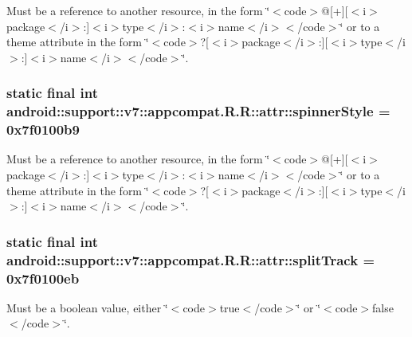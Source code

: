Must be a reference to another resource, in the form \char`\"{}$<$code$>$@\mbox{[}+\mbox{]}\mbox{[}$<$i$>$package$<$/i$>$:\mbox{]}$<$i$>$type$<$/i$>$:$<$i$>$name$<$/i$>$$<$/code$>$\char`\"{} or to a theme attribute in the form \char`\"{}$<$code$>$?\mbox{[}$<$i$>$package$<$/i$>$:\mbox{]}\mbox{[}$<$i$>$type$<$/i$>$:\mbox{]}$<$i$>$name$<$/i$>$$<$/code$>$\char`\"{}. \hypertarget{classandroid_1_1support_1_1v7_1_1appcompat_1_1_r_1_1attr_24d201f044f0d5b840ca6de000935185}{
\subsubsection[{spinnerStyle}]{\setlength{\rightskip}{0pt plus 5cm}static final int android::support::v7::appcompat.R.R::attr::spinnerStyle = 0x7f0100b9}}
\label{classandroid_1_1support_1_1v7_1_1appcompat_1_1_r_1_1attr_24d201f044f0d5b840ca6de000935185}


Must be a reference to another resource, in the form \char`\"{}$<$code$>$@\mbox{[}+\mbox{]}\mbox{[}$<$i$>$package$<$/i$>$:\mbox{]}$<$i$>$type$<$/i$>$:$<$i$>$name$<$/i$>$$<$/code$>$\char`\"{} or to a theme attribute in the form \char`\"{}$<$code$>$?\mbox{[}$<$i$>$package$<$/i$>$:\mbox{]}\mbox{[}$<$i$>$type$<$/i$>$:\mbox{]}$<$i$>$name$<$/i$>$$<$/code$>$\char`\"{}. \hypertarget{classandroid_1_1support_1_1v7_1_1appcompat_1_1_r_1_1attr_70ef0c886c3a0e04aaa65552666d0dc7}{
\subsubsection[{splitTrack}]{\setlength{\rightskip}{0pt plus 5cm}static final int android::support::v7::appcompat.R.R::attr::splitTrack = 0x7f0100eb}}
\label{classandroid_1_1support_1_1v7_1_1appcompat_1_1_r_1_1attr_70ef0c886c3a0e04aaa65552666d0dc7}


Must be a boolean value, either \char`\"{}$<$code$>$true$<$/code$>$\char`\"{} or \char`\"{}$<$code$>$false$<$/code$>$\char`\"{}. 

